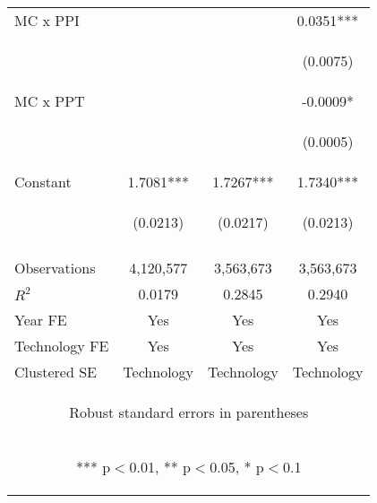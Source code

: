 \begin{center}
\begin{tabular}{lccc}
MC x PPI &  &  & 0.0351*** \\
\vspace{4pt} & \begin{footnotesize}\end{footnotesize} & \begin{footnotesize}\end{footnotesize} & \begin{footnotesize}(0.0075)\end{footnotesize} \\
MC x PPT &  &  & -0.0009* \\
\vspace{4pt} & \begin{footnotesize}\end{footnotesize} & \begin{footnotesize}\end{footnotesize} & \begin{footnotesize}(0.0005)\end{footnotesize} \\
Constant & 1.7081*** & 1.7267*** & 1.7340*** \\
 & \begin{footnotesize}(0.0213)\end{footnotesize} & \begin{footnotesize}(0.0217)\end{footnotesize} & \begin{footnotesize}(0.0213)\end{footnotesize} \\
\vspace{4pt} & \begin{footnotesize}\end{footnotesize} & \begin{footnotesize}\end{footnotesize} & \begin{footnotesize}\end{footnotesize} \\
Observations & 4,120,577 & 3,563,673 & 3,563,673 \\
$R^2$ & 0.0179 & 0.2845 & 0.2940 \\
Year FE & Yes & Yes & Yes \\
Technology FE & Yes & Yes & Yes \\
 Clustered SE & Technology & Technology & Technology \\ \hline
\multicolumn{4}{c}{\begin{footnotesize} Robust standard errors in parentheses\end{footnotesize}} \\
\multicolumn{4}{c}{\begin{footnotesize} *** p$<$0.01, ** p$<$0.05, * p$<$0.1\end{footnotesize}} \\
\end{tabular}
\end{center}
